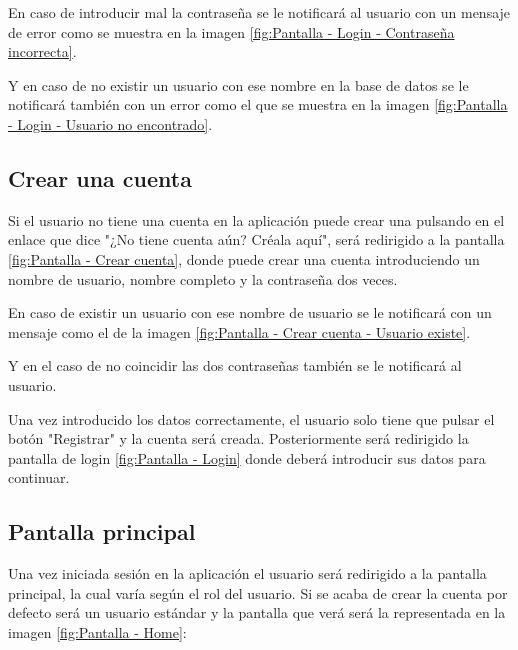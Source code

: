 En caso de introducir mal la contraseña se le notificará al usuario con un mensaje de error como se muestra en la imagen \ref{fig:Pantalla - Login - Contraseña incorrecta}.

Y en caso de no existir un usuario con ese nombre en la base de datos se le notificará también con un error como el que se muestra en la imagen \ref{fig:Pantalla - Login - Usuario no encontrado}.


\subsection{Crear una cuenta}\label{crear-cuenta}

Si el usuario no tiene una cuenta en la aplicación puede crear una pulsando en el enlace que dice "¿No tiene cuenta aún? Créala aquí", será redirigido a la pantalla  \ref{fig:Pantalla - Crear cuenta}, donde puede crear una cuenta introduciendo un nombre de usuario, nombre completo y la contraseña dos veces.

En caso de existir un usuario con ese nombre de usuario se le notificará con un mensaje como el de la imagen \ref{fig:Pantalla - Crear cuenta - Usuario existe}.

Y en el caso de no coincidir las dos contraseñas también se le notificará al usuario.

Una vez introducido los datos correctamente, el usuario solo tiene que pulsar el botón "Registrar" y la cuenta será creada. Posteriormente será redirigido la pantalla de login \ref{fig:Pantalla - Login} donde deberá introducir sus datos para continuar.


\subsection{Pantalla principal}\label{home}
Una vez iniciada sesión en la aplicación el usuario será redirigido a la pantalla principal, la cual varía según el rol del usuario. Si se acaba de crear la cuenta por defecto será un usuario estándar y la pantalla que verá será la representada en la imagen \ref{fig:Pantalla - Home}:

